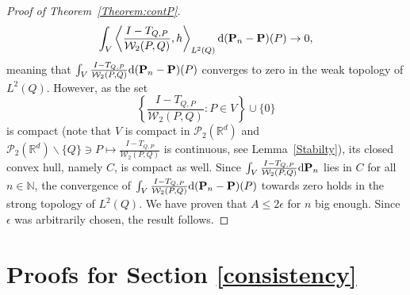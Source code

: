 \documentclass{imsart}
\numberwithin{equation}{section}
\def\N{\mathbb{N}}
\def\R{\mathbb{R}}
\def\N{\mathbb N}
\begin{document}
\begin{proof}[Proof of Theorem~\ref{Theorem:contP}]
	$$ \int_{V}  \left\langle  \frac{I-T_{Q,P} }{\mathcal{W}_2(P,Q)} ,  h \right\rangle_{L^2(Q)}  \mathrm{d}({\bf P}_n-{\bf P})(P) \to 0 ,$$
	meaning that 
	$ \int_{V}    \frac{I-T_{Q,P} }{\mathcal{W}_2(P,Q)}  \mathrm{d}({\bf P}_n-{\bf P})(P)  $ converges to zero in the weak topology of $L^2(Q)$. However, as the set
	$$ \left\{ \frac{I-T_{Q,P} }{\mathcal{W}_2(P,Q)} : P\in V\right\} \cup \{ 0\} $$
	is compact (note that $V$ is compact in $\mathcal{P}_{2}(\R^d)$ and  $\mathcal{P}_{2}(\R^d)
	\backslash 
	\{ Q \}
	\ni  P\mapsto  \frac{I-T_{Q,P} }{\mathcal{W}_2(P,Q)}$ is continuous, see Lemma~\ref{Stabilty}), its closed convex hull, namely $C$, is compact as well.   Since $ \int_V  \frac{I-T_{Q,P} }{\mathcal{W}_2(P,Q)}  \mathrm{d} {\bf P}_n $ lies in $C$ for all $n\in \N$, the convergence of  $ \int_{V}    \frac{I-T_{Q,P} }{\mathcal{W}_2(P,Q)}  \mathrm{d}({\bf P}_n-{\bf P})(P)  $ towards zero holds in the strong topology of  $L^2(Q)$.  We have proven that 
	$A\leq 2 \epsilon$ for $n$ big enough. Since $\epsilon$ was arbitrarily chosen, the result follows. 
\end{proof}



\section{Proofs for Section \ref{consistency}}
\end{document}
